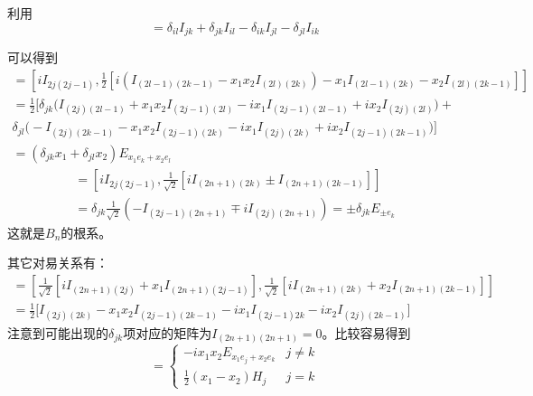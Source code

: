 \documentclass{ctexart}
\begin{document}
	利用
	\begin{equation}
	[I_{ij},I_{kl}]=\delta_{il}I_{jk}+\delta_{jk}I_{il}-\delta_{ik}I_{jl}-\delta_{jl}I_{ik}
	\end{equation}
	
	可以得到
	\begin{multline}
	[H_j,E_{x_1e_k+x_2e_l}]=\left[iI_{2j(2j-1)},\frac{1}{2}\left[i(I_{(2l-1)(2k-1)}-x_1x_2 I_{(2l)(2k)})-x_1I_{(2l-1)(2k)}-x_2I_{(2l)(2k-1)}\right]\right]\\
	=\frac{1}{2}\bigg[\delta_{jk}\big(I_{(2j)(2l-1)}+x_1x_2I_{(2j-1)(2l)}-ix_1I_{(2j-1)(2l-1)}+ix_2I_{(2j)(2l)}\big)+\\\delta_{jl}\big(-I_{(2j)(2k-1)}-x_1x_2I_{(2j-1)(2k)}-ix_1I_{(2j)(2k)}+ix_2I_{(2j-1)(2k-1)}\big)\bigg]\\=(\delta_{jk}x_1+\delta_{jl}x_2)E_{x_1e_k+x_2e_l}
	\end{multline}
	\begin{multline}
	[H_j,E_{\pm e_k}]=\left[iI_{2j(2j-1)},\frac{1}{\sqrt 2}\left[iI_{(2n+1)(2k)}\pm I_{(2n+1)(2k-1)}\right]\right]\\=\delta_{jk}\frac{1}{\sqrt 2}(-I_{(2j-1)(2n+1)}\mp iI_{(2j)(2n+1)})=\pm\delta_{jk}E_{\pm e_k}
	\end{multline}
	这就是$B_n$的根系。
	
	其它对易关系有：
	\begin{multline}
	[E_{x_1e_j},E_{x_2e_k}]=\left[\frac{1}{\sqrt 2}\left[iI_{(2n+1)(2j)}+x_1 I_{(2n+1)(2j-1)}\right],\frac{1}{\sqrt 2}\left[iI_{(2n+1)(2k)}+x_2 I_{(2n+1)(2k-1)}\right]\right]\\
	=\frac{1}{2}\bigg[I_{(2j)(2k)}-x_1x_2I_{(2j-1)(2k-1)}-ix_1I_{(2j-1)2k}-ix_2I_{(2j)(2k-1)}\bigg]
	\end{multline}
	注意到可能出现的$\delta_{jk}$项对应的矩阵为$I_{(2n+1)(2n+1)}=0$。比较容易得到
	\begin{equation}
	[E_{x_1e_j},E_{x_2e_k}]=\begin{cases}
	-ix_1x_2E_{x_1e_j+x_2e_k} & j\neq k\\
	\frac{1}{2}(x_1-x_2)H_j & j=k
	\end{cases}
	\end{equation}
	
\end{document}
